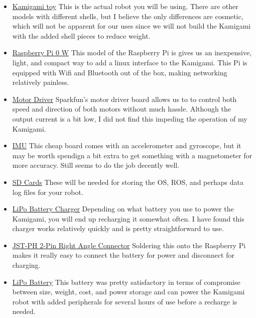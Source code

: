 \documentclass[11pt]{article}
\begin{document}
\begin{itemize}
    \item \href{https://www.amzn.com/gp/product/B06ZYVMZC5/}{Kamigami toy}
    This is the actual robot you will be using. There are other models with different shells, but I believe the only differences are cosmetic, which will not be apparent for our uses since we will not build the Kamigami with the added shell pieces to reduce weight.
    
    \item \href{https://www.adafruit.com/product/3400}{Raspberry Pi 0 W}
    This model of the Raspberry Pi is gives us an inexpensive, light, and compact way to add a linux interface to the Kamigami. This Pi is equipped with Wifi and Bluetooth out of the box, making networking relatively painless.
    
    \item \href{https://www.sparkfun.com/products/14451}{Motor Driver}
    Sparkfun's motor driver board allows us to to control both speed and direction of both motors without much hassle. Although the output current is a bit low, I did not find this impeding the operation of my Kamigami.
    
    \item \href{https://www.adafruit.com/product/4480}{IMU} This cheap board comes with an accelerometer and gyroscope, but it may be worth spendign a bit extra to get something with a magnetometer for more accuracy. Still seems to do the job decently well.
    
    \item \href{https://www.amzn.com//dp/B07TDN2G18/}{SD Cards} These will be needed for storing the OS, ROS, and perhaps data log files for your robot.
    
    \item \href{https://www.adafruit.com/product/259}{LiPo Battery Charger} Depending on what battery you use to power the Kamigami, you will end up recharging it somewhat often. I have found this charger works relatively quickly and is pretty straightforward to use.
    
    \item \href{https://www.adafruit.com/product/1862}{JST-PH 2-Pin Right Angle Connector} Soldering this onto the Raspberry Pi makes it really easy to connect the battery for power and disconnect for charging.
    
    \item \href{https://www.adafruit.com/product/1862}{LiPo Battery} This battery was pretty satisfactory in terms of compromise between size, weight, cost, and power storage and can power the Kamigami robot with added peripherals for several hours of use before a recharge is needed.
    
\end{itemize}
\end{document}
